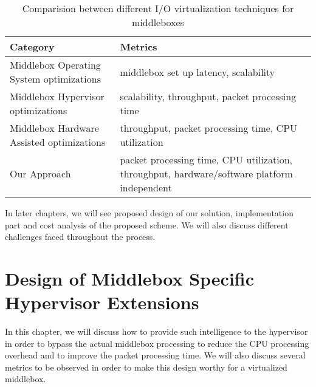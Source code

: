 \documentclass[a4paper,11pt]{report}
\begin{document}
\begin{table}[H]
\centering
\begin{tabular}{ | L{4cm} | L{10.3cm} | }
\hline
{\textbf {Category}} & {\textbf {Metrics}}\\ %
\hline
\hline
{Middlebox Operating System optimizations} & {middlebox set up latency, scalability} \\ %
\hline
{Middlebox Hypervisor optimizations}&{scalability, throughput, packet processing time}\\ %
\hline
{Middlebox Hardware Assisted optimizations}&{throughput, packet processing time, CPU utilization}\\ %
\hline
{Our Approach}&{packet processing time, CPU utilization, throughput, hardware/software platform independent}\\
\hline
\end{tabular}
\caption{Comparision between different I/O virtualization techniques for middleboxes}
\end{table}
\bigskip
In later chapters, we will see proposed design of our solution, implementation part and cost analysis of the proposed scheme. We will also discuss different challenges faced throughout the process.   

\chapter{Design of Middlebox Specific Hypervisor Extensions}
In this chapter, we will discuss how to provide such intelligence to the hypervisor in order to bypass the actual middlebox processing to reduce the CPU processing overhead and to improve the packet processing time. We will also discuss several metrics to be observed in order to make this design worthy for a virtualized middlebox. 
\end{document}
